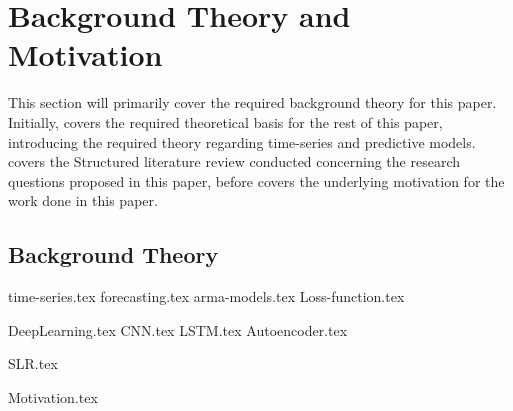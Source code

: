 \chapter{Background Theory and Motivation}\label{T-B}
\label{cha:TheoryAndBackground}


This section will primarily cover the required background theory for this paper.
Initially,  covers the required theoretical basis for the rest of this paper,
introducing the required theory regarding time-series and predictive models.
 covers the Structured literature review conducted concerning the research questions proposed in this paper,
before  covers the underlying motivation for the work done in this paper.
 


\section{Background Theory}
\label{section:BT:BackgroundTheory}
{time-series.tex}
{forecasting.tex}
{arma-models.tex}
{Loss-function.tex}

{DeepLearning.tex}
{CNN.tex}
{LSTM.tex}
{Autoencoder.tex}



{SLR.tex}


{Motivation.tex}
